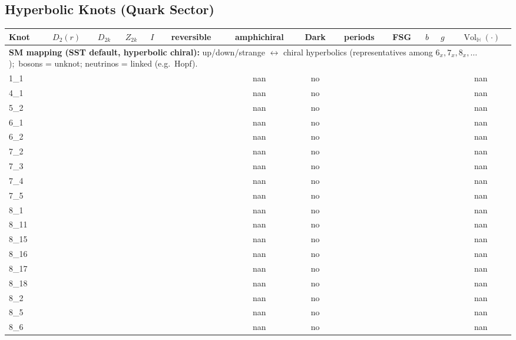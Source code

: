 \documentclass[a4paper,11pt]{article}
\newcommand{\VolH}[1]{\operatorname{Vol}_{\!\mathbb{H}}(#1)}
\begin{document}
\subsection*{Hyperbolic Knots (Quark Sector)}
\begin{longtable}{lcccccccccccc}
\toprule
Knot & $D_2(r)$ & $D_{2k}$ & $Z_{2k}$ & $I$ & reversible & amphichiral & Dark & periods & FSG & $b$ & $g$ & $\VolH{\cdot}$ \\
\midrule
\multicolumn{13}{l}{\textbf{SM mapping (SST default, hyperbolic chiral):} up/down/strange $\leftrightarrow$ chiral hyperbolics (representatives among $6_x,7_x,8_x,\dots$);\ bosons = unknot; neutrinos = linked (e.g.\ Hopf).} \\ \hline
1\_1 &  &  &  &  &  & nan & no &  &  &  &  & nan \\
4\_1 &  &  &  &  &  & nan & no &  &  &  &  & nan \\
5\_2 &  &  &  &  &  & nan & no &  &  &  &  & nan \\
6\_1 &  &  &  &  &  & nan & no &  &  &  &  & nan \\
6\_2 &  &  &  &  &  & nan & no &  &  &  &  & nan \\
7\_2 &  &  &  &  &  & nan & no &  &  &  &  & nan \\
7\_3 &  &  &  &  &  & nan & no &  &  &  &  & nan \\
7\_4 &  &  &  &  &  & nan & no &  &  &  &  & nan \\
7\_5 &  &  &  &  &  & nan & no &  &  &  &  & nan \\
8\_1 &  &  &  &  &  & nan & no &  &  &  &  & nan \\
8\_11 &  &  &  &  &  & nan & no &  &  &  &  & nan \\
8\_15 &  &  &  &  &  & nan & no &  &  &  &  & nan \\
8\_16 &  &  &  &  &  & nan & no &  &  &  &  & nan \\
8\_17 &  &  &  &  &  & nan & no &  &  &  &  & nan \\
8\_18 &  &  &  &  &  & nan & no &  &  &  &  & nan \\
8\_2 &  &  &  &  &  & nan & no &  &  &  &  & nan \\
8\_5 &  &  &  &  &  & nan & no &  &  &  &  & nan \\
8\_6 &  &  &  &  &  & nan & no &  &  &  &  & nan \\
\bottomrule
\end{longtable}
\end{document}
